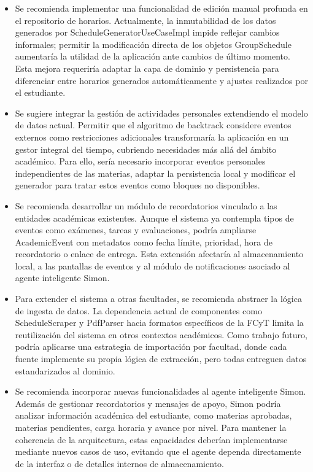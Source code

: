 \begin{itemize}
\setlength\itemsep{0.45em}\setlength\parskip{0.45em}\setlength\parsep{0.45em}

\item Se recomienda implementar una funcionalidad de edición manual profunda en el repositorio de horarios. Actualmente, la inmutabilidad de los datos generados por ScheduleGeneratorUseCaseImpl impide reflejar cambios informales; permitir la modificación directa de los objetos GroupSchedule aumentaría la utilidad de la aplicación ante cambios de último momento. Esta mejora requeriría adaptar la capa de dominio y persistencia para diferenciar entre horarios generados automáticamente y ajustes realizados por el estudiante.

\item Se sugiere integrar la gestión de actividades personales extendiendo el modelo de datos actual. Permitir que el algoritmo de backtrack considere eventos externos como restricciones adicionales transformaría la aplicación en un gestor integral del tiempo, cubriendo necesidades más allá del ámbito académico. Para ello, sería necesario incorporar eventos personales independientes de las materias, adaptar la persistencia local y modificar el generador para tratar estos eventos como bloques no disponibles.

\item Se recomienda desarrollar un módulo de recordatorios vinculado a las entidades académicas existentes. Aunque el sistema ya contempla tipos de eventos como exámenes, tareas y evaluaciones, podría ampliarse AcademicEvent con metadatos como fecha límite, prioridad, hora de recordatorio o enlace de entrega. Esta extensión afectaría al almacenamiento local, a las pantallas de eventos y al módulo de notificaciones asociado al agente inteligente Simon.

\item Para extender el sistema a otras facultades, se recomienda abstraer la lógica de ingesta de datos. La dependencia actual de componentes como ScheduleScraper y PdfParser hacia formatos específicos de la FCyT limita la reutilización del sistema en otros contextos académicos. Como trabajo futuro, podría aplicarse una estrategia de importación por facultad, donde cada fuente implemente su propia lógica de extracción, pero todas entreguen datos estandarizados al dominio.

\item Se recomienda incorporar nuevas funcionalidades al agente inteligente Simon. Además de gestionar recordatorios y mensajes de apoyo, Simon podría analizar información académica del estudiante, como materias aprobadas, materias pendientes, carga horaria y avance por nivel. Para mantener la coherencia de la arquitectura, estas capacidades deberían implementarse mediante nuevos casos de uso, evitando que el agente dependa directamente de la interfaz o de detalles internos de almacenamiento.


\end{itemize}
